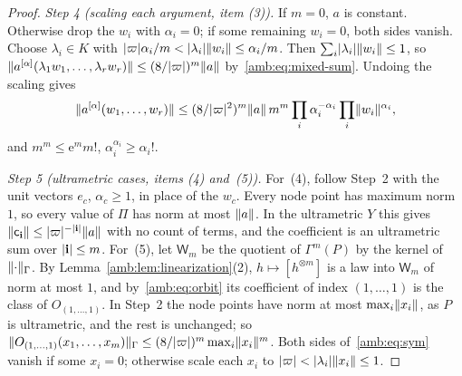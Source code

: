 \begin{proof}
\emph{Step 4 (scaling each argument, item (3)).} If $m=0$, $a$ is constant. Otherwise drop the $w_i$ with $\alpha_i=0$; if some remaining $w_i=0$, both sides vanish. Choose $\lambda_i\in K$ with $\lvert \varpi\rvert\alpha_i/m<\lvert \lambda_i\rvert\lVert w_i\rVert\le\alpha_i/m$. Then $\sum_i\lvert \lambda_i\rvert\lVert w_i\rVert\le1$, so $\lVert a^{[\alpha]}(\lambda_1w_1,\dots,\lambda_rw_r)\rVert\le(8/\lvert \varpi\rvert)^m\lVert a\rVert$ by~\eqref{amb:eq:mixed-sum}. Undoing the scaling gives
\[
 \lVert a^{[\alpha]}(w_1,\dots,w_r)\rVert\le(8/\lvert \varpi\rvert^2)^m\lVert a\rVert\,m^m\prod_i\alpha_i^{-\alpha_i}\prod_i\lVert w_i\rVert^{\alpha_i},
\]
and $m^m\le\mathrm e^mm!$, $\alpha_i^{\alpha_i}\ge\alpha_i!$.

\emph{Step 5 (ultrametric cases, items (4) and~(5)).} For~(4), follow Step~2 with the unit vectors $e_c$, $\alpha_c\ge1$, in place of the $w_c$. Every node point has maximum norm $1$, so every value of $\Pi$ has norm at most $\lVert a\rVert$. In the ultrametric $Y$ this gives $\lVert \mathsf c_{\mathbf i}\rVert\le\lvert \varpi\rvert^{-\lvert \mathbf i\rvert}\lVert a\rVert$ with no count of terms, and the coefficient is an ultrametric sum over $\lvert \mathbf i\rvert\le m$. For~(5), let $\mathsf W_m$ be the quotient of $\Gamma^m(P)$ by the kernel of $\lVert \cdot\rVert_\Gamma$. By Lemma~\ref{amb:lem:linearization}(2), $h\mapsto[h^{\otimes m}]$ is a law into $\mathsf W_m$ of norm at most $1$, and by~\eqref{amb:eq:orbit} its coefficient of index $(1,\dots,1)$ is the class of $O_{(1,\dots,1)}$. In Step~2 the node points have norm at most $\max_i\lVert x_i\rVert$, as $P$ is ultrametric, and the rest is unchanged; so $\lVert O_{(1,\dots,1)}(x_1,\dots,x_m)\rVert_\Gamma\le(8/\lvert \varpi\rvert)^m\max_i\lVert x_i\rVert^m$. Both sides of~\eqref{amb:eq:sym} vanish if some $x_i=0$; otherwise scale each $x_i$ to $\lvert \varpi\rvert<\lvert \lambda_i\rvert\lVert x_i\rVert\le1$.
\end{proof}

